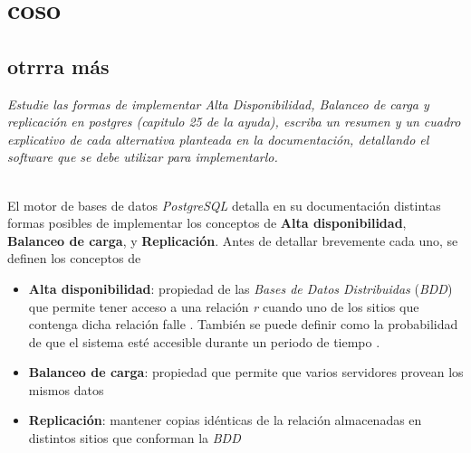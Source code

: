 







\clearpage
\tableofcontents
\clearpage 



\section{coso}
\subsection{otrrra más}
\emph{Estudie las formas de implementar Alta Disponibilidad, Balanceo de carga y replicación en postgres (capitulo 25 de la ayuda), escriba un resumen y un cuadro explicativo de cada alternativa planteada en la documentación, detallando el software que se debe utilizar para implementarlo.} 

~\\

El motor de bases de datos \emph{PostgreSQL} detalla en su documentación distintas formas posibles de implementar los conceptos de \textbf{Alta disponibilidad}, \textbf{Balanceo de carga}, y \textbf{Replicación}. Antes de detallar brevemente cada uno, se definen los conceptos de
\begin{itemize}
    \item \textbf{Alta disponibilidad}: propiedad de las \emph{Bases de Datos Distribuidas} (\emph{BDD}) que permite tener acceso a una relación \emph{r} cuando uno de los sitios que contenga dicha relación falle \autocite{silberschatz}. También se puede definir como la probabilidad de que el sistema esté accesible durante un periodo de tiempo \autocite{elmasri}.
    \item \textbf{Balanceo de carga}: propiedad que permite que varios servidores provean los mismos datos \autocite{high-availability}
    \item \textbf{Replicación}: mantener copias idénticas de la relación almacenadas en distintos sitios que conforman la \emph{BDD} \autocite{silberschatz} 
\end{itemize}

